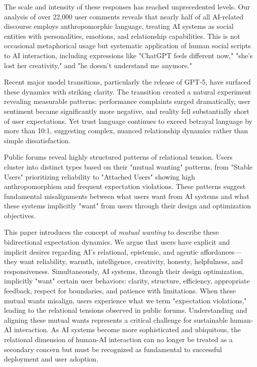 \documentclass{article}
\begin{document}
The scale and intensity of these responses has reached unprecedented levels. Our analysis of over 22,000 user comments reveals that nearly half of all AI-related discourse employs anthropomorphic language, treating AI systems as social entities with personalities, emotions, and relationship capabilities. This is not occasional metaphorical usage but systematic application of human social scripts to AI interaction, including expressions like "ChatGPT feels different now," "she's lost her creativity," and "he doesn't understand me anymore."

Recent major model transitions, particularly the release of GPT-5, have surfaced these dynamics with striking clarity. The transition created a natural experiment revealing measurable patterns: performance complaints surged dramatically, user sentiment became significantly more negative, and reality fell substantially short of user expectations. Yet trust language continues to exceed betrayal language by more than 10:1, suggesting complex, nuanced relationship dynamics rather than simple dissatisfaction.

Public forums reveal highly structured patterns of relational tension. Users cluster into distinct types based on their "mutual wanting" patterns, from "Stable Users" prioritizing reliability to "Attached Users" showing high anthropomorphism and frequent expectation violations. These patterns suggest fundamental misalignments between what users want from AI systems and what these systems implicitly "want" from users through their design and optimization objectives.

This paper introduces the concept of \emph{mutual wanting} to describe these bidirectional expectation dynamics. We argue that users have explicit and implicit desires regarding AI's relational, epistemic, and agentic affordances—they want reliability, warmth, intelligence, creativity, honesty, helpfulness, and responsiveness. Simultaneously, AI systems, through their design optimization, implicitly "want" certain user behaviors: clarity, structure, efficiency, appropriate feedback, respect for boundaries, and patience with limitations. When these mutual wants misalign, users experience what we term "expectation violations," leading to the relational tensions observed in public forums.
Understanding and aligning these mutual wants represents a critical challenge for sustainable human-AI interaction. As AI systems become more sophisticated and ubiquitous, the relational dimension of human-AI interaction can no longer be treated as a secondary concern but must be recognized as fundamental to successful deployment and user adoption.
\end{document}
